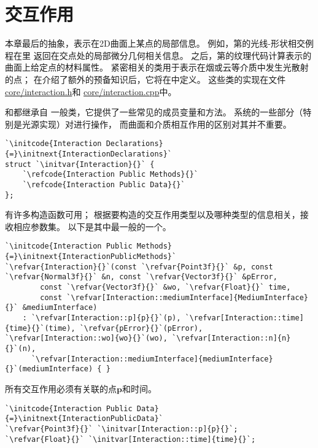 \section{交互作用}\label{sec:交互作用}

本章最后的抽象，表示在2D曲面上某点的局部信息。
例如，第的光线-形状相交例程在里
返回在交点处的局部微分几何相关信息。
之后，第的纹理代码计算表示的曲面上给定点的材料属性。
紧密相关的类用于表示在烟或云等介质中发生光散射的点；
在介绍了额外的预备知识后，它将在中定义。
这些类的实现在文件\href{https://github.com/mmp/pbrt-v3/tree/master/src/core/interaction.h}{\ttfamily core/interaction.h}和
\href{https://github.com/mmp/pbrt-v3/tree/master/src/core/interaction.cpp}{\ttfamily core/interaction.cpp}中。

和都继承自
一般类，它提供了一些常见的成员变量和方法。
系统的一些部分（特别是光源实现）对进行操作，
而曲面和介质相互作用的区别对其并不重要。

\begin{lstlisting}
`\initcode{Interaction Declarations}{=}\initnext{InteractionDeclarations}`
struct `\initvar{Interaction}{}` {
    `\refcode{Interaction Public Methods}{}`
    `\refcode{Interaction Public Data}{}`
};
\end{lstlisting}

有许多构造函数可用；
根据要构造的交互作用类型以及哪种类型的信息相关，接收相应参数集。
以下是其中最一般的一个。
\begin{lstlisting}
`\initcode{Interaction Public Methods}{=}\initnext{InteractionPublicMethods}`
`\refvar{Interaction}{}`(const `\refvar{Point3f}{}` &p, const `\refvar{Normal3f}{}` &n, const `\refvar{Vector3f}{}` &pError,
        const `\refvar{Vector3f}{}` &wo, `\refvar{Float}{}` time,
        const `\refvar[Interaction::mediumInterface]{MediumInterface}{}` &mediumInterface)
    : `\refvar[Interaction::p]{p}{}`(p), `\refvar[Interaction::time]{time}{}`(time), `\refvar{pError}{}`(pError), `\refvar[Interaction::wo]{wo}{}`(wo), `\refvar[Interaction::n]{n}{}`(n),
      `\refvar[Interaction::mediumInterface]{mediumInterface}{}`(mediumInterface) { }
\end{lstlisting}

所有交互作用必须有关联的点$\bm p$和时间。
\begin{lstlisting}
`\initcode{Interaction Public Data}{=}\initnext{InteractionPublicData}`
`\refvar{Point3f}{}` `\initvar[Interaction::p]{p}{}`;
`\refvar{Float}{}` `\initvar[Interaction::time]{time}{}`;
\end{lstlisting}

